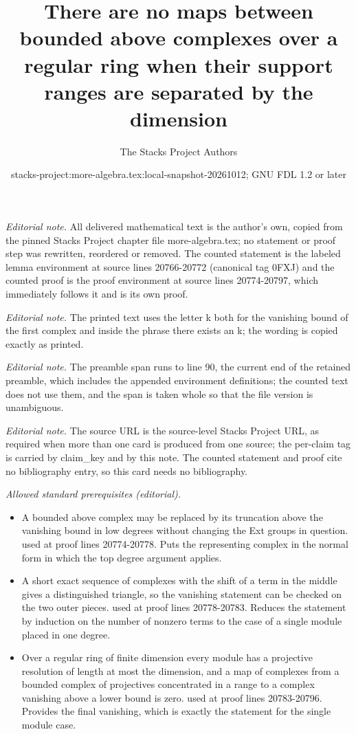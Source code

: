 \documentclass[10pt,a4paper]{amsart}
\title{There are no maps between bounded above complexes over a regular ring when their support ranges are separated by the dimension}
\author{The Stacks Project Authors}
\date{stacks-project:more-algebra.tex:local-snapshot-20261012; GNU FDL 1.2 or later}
\theoremstyle{plain}
\theoremstyle{definition}
\theoremstyle{remark}
\numberwithin{equation}{subsection}
\begin{document}
\maketitle
\setcounter{subsection}{1}
\noindent\textit{Editorial note.} All delivered mathematical text is the author's own, copied from the pinned Stacks Project chapter file more-algebra.tex; no statement or proof step was rewritten, reordered or removed. The counted statement is the labeled lemma environment at source lines 20766-20772 (canonical tag 0FXJ) and the counted proof is the proof environment at source lines 20774-20797, which immediately follows it and is its own proof.\par\medskip
\noindent\textit{Editorial note.} The printed text uses the letter k both for the vanishing bound of the first complex and inside the phrase there exists an k; the wording is copied exactly as printed.\par\medskip
\noindent\textit{Editorial note.} The preamble span runs to line 90, the current end of the retained preamble, which includes the appended environment definitions; the counted text does not use them, and the span is taken whole so that the file version is unambiguous.\par\medskip
\noindent\textit{Editorial note.} The source URL is the source-level Stacks Project URL, as required when more than one card is produced from one source; the per-claim tag is carried by claim\_key and by this note. The counted statement and proof cite no bibliography entry, so this card needs no bibliography.\par\medskip
\noindent\textit{Allowed standard prerequisites (editorial).}\begin{itemize}
\item A bounded above complex may be replaced by its truncation above the vanishing bound in low degrees without changing the Ext groups in question. used at proof lines 20774-20778. Puts the representing complex in the normal form in which the top degree argument applies.
\item A short exact sequence of complexes with the shift of a term in the middle gives a distinguished triangle, so the vanishing statement can be checked on the two outer pieces. used at proof lines 20778-20783. Reduces the statement by induction on the number of nonzero terms to the case of a single module placed in one degree.
\item Over a regular ring of finite dimension every module has a projective resolution of length at most the dimension, and a map of complexes from a bounded complex of projectives concentrated in a range to a complex vanishing above a lower bound is zero. used at proof lines 20783-20796. Provides the final vanishing, which is exactly the statement for the single module case.
\end{itemize}\medskip
\end{document}
